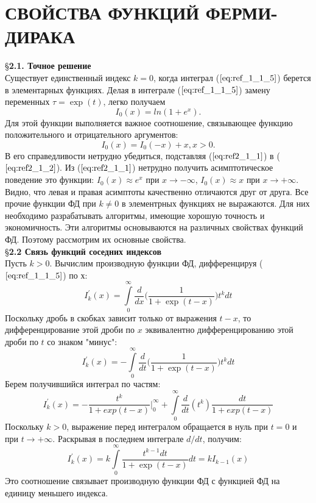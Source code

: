 \chapter{СВОЙСТВА ФУНКЦИЙ ФЕРМИ-ДИРАКА}

\S \textbf{2.1. Точное решение }
\\

Существует единственный индекс $k = 0$, когда интеграл ($\ref{eq:ref_1_1_5}$) берется в элементарных функциях. Делая в интеграле ($\ref{eq:ref_1_1_5}$) замену переменных $\tau = \exp{(t)}$, легко получаем
\begin{equation}
I_0(x) = ln(1+e^{x}).
\label{eq:ref2_1_1}
\end{equation}
Для этой функции выполняется важное соотношение, связывающее функцию положительного и отрицательного аргументов:
\begin{equation}
I_0(x) = I_0(-x) + x, x > 0.
\label{eq:ref2_1_2}
\end{equation}
В его справедливости нетрудно убедиться, подставляя ($\ref{eq:ref2_1_1}$) в ($\ref{eq:ref2_1_2}$).
\newline
\indent
Из ($\ref{eq:ref2_1_1}$) нетрудно получить асимптотическое поведение это функции: $I_0(x) \approx e^{x}$ при $ x \to -\infty$, $I_0(x) \approx x$ при $x \to +\infty$. Видно, что левая и правая асимптоты качественно отличаются друг от друга.
\newline
\indent
Все прочие функции ФД при $k \neq 0$ в элементрных функциях не выражаются. Для них необходимо разрабатывать алгоритмы, имеющие хорошую точность и экономичность. Эти алгоритмы основываются на различных свойствах функций ФД. Поэтому рассмотрим их основные свойства.
\\

\S \textbf{2.2 Связь функций соседних индексов}
\\

Пусть $k > 0$. Вычислим производную функции ФД, дифференцируя ($\ref{eq:ref_1_1_5}$) по $х$:
\begin{equation}
I_{k}^{'}(x) = \int\limits_0^{\infty} \frac{d}{dx}\bigg(\frac{1}{1+\exp{(t-x)}}\bigg)t^{k}dt
\end{equation}
Поскольку дробь в скобках зависит только от выражения $t - x$, то
дифференцирование этой дроби по $x$ эквивалентно дифференцированию этой
дроби по $t$ со знаком "минус":
\begin{equation}
I_{k}^{'}(x) = -\int\limits_0^{\infty} \frac{d}{dt}\bigg(\frac{1}{1+\exp{(t-x)}}\bigg)t^{k}dt
\end{equation}
Берем получившийся интеграл по частям:
\begin{equation}
I_{k}^{'}(x) = -\frac{t^{k}}{1+exp{(t-x)}}\bigg|_0^{\infty} + \int\limits_0^{\infty} \frac{d}{dt}(t^k)\frac{dt}{1+exp{(t-x)}}
\end{equation}
Поскольку $k > 0$, выражение перед интегралом обращается в нуль при $t = 0$ и
при $t \to +\infty$. Раскрывая в последнем интеграле $d/dt$, получим:
\begin{equation}
I_{k}^{'}(x) = k\int\limits_0^{\infty} \frac{t^{k-1}dt}{1+\exp{(t-x)}}dt = kI_{k-1}(x)
\label{eq:ref23}
\end{equation}
Это соотношение связывает производную функции ФД с функцией ФД на
единицу меньшего индекса.

